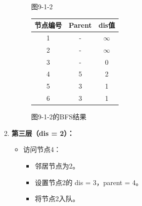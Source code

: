 \documentclass{article}
\begin{document}
\begin{enumerate}
\begin{figure}[htbp]
\begin{minipage}[b]{0.6\textwidth}
                \caption{图9-1-2}
                \label{fig:9-1-2}
            \end{minipage}%
            \hfill%
            \begin{minipage}[b]{0.4\textwidth}    %
                \centering
                \begin{tabular}{|c|c|c|}
                    \hline
                    节点编号 & Parent & dis值 \\
                    \hline
                    1 & - & $\infty$ \\
                    2 & - & $\infty$ \\
                    3 & - & 0 \\
                    4 & 5 & 2 \\
                    5 & 3 & 1 \\
                    6 & 3 & 1 \\
                    \hline
                \end{tabular}
                \caption{图9-1-2的BFS结果}
                \label{tab:graph9-1-2-bfs}
            \end{minipage}
        \end{figure}
             
    \pagebreak

    \item \textbf{第三层（dis = 2）：}
    \begin{itemize}
        \item 访问节点4：
        \begin{itemize}
            \item 邻居节点为2。
            \item 设置节点2的 dis = 3，parent = 4。
            \item 将节点2入队。
        \end{itemize}
    \end{itemize}


\end{enumerate}
\end{document}
